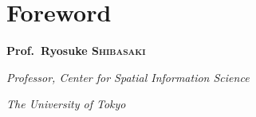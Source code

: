 \chapter*{Foreword}

\tab \lipsum




\begin{flushright}
\vspace{1 cm}
{\Large \bfseries Prof.~Ryosuke \textsc{Shibasaki}\par}
\vspace{0.2 cm}
{\itshape Professor, Center for Spatial Information Science\par}
{\itshape The University of Tokyo\par}
\end{flushright}
